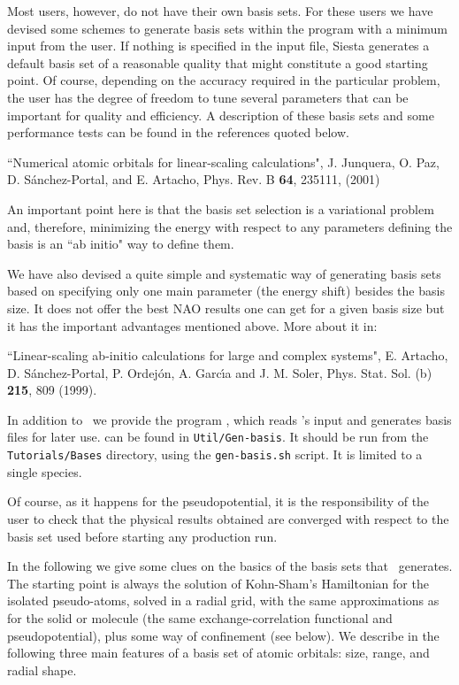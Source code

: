 Most users, however, do not have their own basis sets. For these users
we have devised some schemes to generate basis sets within the program
with a minimum input from the user.  If nothing is specified in the
input file, Siesta generates a default basis set of a reasonable
quality that might constitute a good starting point.  Of course,
depending on the accuracy required in the particular problem, the user
has the degree of freedom to tune several parameters that can be
important for quality and efficiency. A description of these basis
sets and some performance tests can be found in the references quoted
below.

\noindent
``Numerical atomic orbitals for linear-scaling calculations",
J. Junquera, O. Paz, D. S\'anchez-Portal, and E. Artacho, Phys. Rev. B
\textbf{64}, 235111, (2001)

An important point here is that the basis set selection is a
variational problem and, therefore, minimizing the energy with respect
to any parameters defining the basis is an ``ab initio" way to
define them.

We have also devised a quite simple and systematic way of generating
basis sets based on specifying only one main parameter (the energy shift)
besides the basis size. It does not offer the best NAO results one can get
for a given basis size but it has the important advantages mentioned above.
More about it in:

\noindent
``Linear-scaling ab-initio calculations for large and complex systems",
E. Artacho, D. S\'anchez-Portal, P. Ordej\'on, A. Garc\'{\i}a and
J. M. Soler, Phys. Stat. Sol. (b) \textbf{215}, 809 (1999).

In addition to \siesta\ we provide the program 
, which reads \siesta's input and
generates basis files for later use.  can be found
in \texttt{Util/Gen-basis}. 
It should be run from the \texttt{Tutorials/Bases} directory,
using the \texttt{gen-basis.sh} script. It is limited to a single species.

Of course, as it happens for the pseudopotential, it is the
responsibility of the user to check that the physical results obtained
are converged with respect to the basis set used before starting any
production run.

In the following we give some clues on the basics of the basis sets
that \siesta\ generates.
  The starting point is always the solution of Kohn-Sham's Hamiltonian
for the isolated pseudo-atoms, solved in a radial grid,
with the same approximations as for the solid or molecule
(the same exchange-correlation functional and  pseudopotential),
plus some way of confinement (see below).
  We describe in the following three main features of a
basis set of atomic orbitals: size, range, and radial shape.


